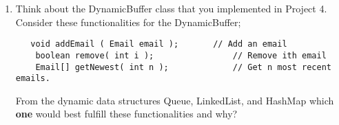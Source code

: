 \documentclass[addpoints]{exam}
\begin{document}
\begin{enumerate}
\item {}
Think about the DynamicBuffer class that you implemented in Project 4. Consider these functionalities for the DynamicBuffer;
\begin{lstlisting}
   void addEmail ( Email email ); 		// Add an email 
	boolean remove( int i ); 			    // Remove ith email
	Email[] getNewest( int n ); 		    // Get n most recent emails.    
\end{lstlisting}
From the dynamic data structures Queue, LinkedList, and HashMap which \textbf{one} would best fulfill these functionalities and why?
\newline
\newline

\vspace{2em}
\end{enumerate}
\end{document}
